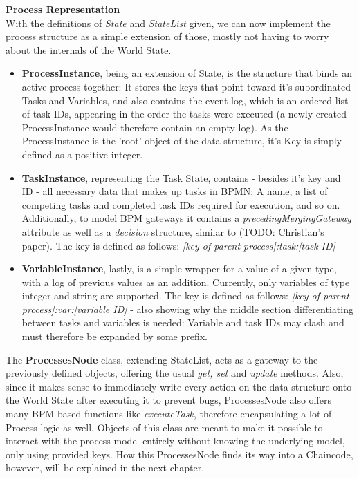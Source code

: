 \textbf{Process Representation} \\[0.2em]
With the definitions of \emph{State} and \emph{StateList} given, we can now implement the process structure as a simple extension of those, mostly not having to worry about the internals of the World State. 
\begin{itemize}
    \item \textbf{ProcessInstance}, being an extension of State, is the structure that binds an active process together: It stores the keys that point toward it's subordinated Tasks and Variables, and also contains the event log, which is an ordered list of task IDs, appearing in the order the tasks were executed (a newly created ProcessInstance would therefore contain an empty log). As the ProcessInstance is the 'root' object of the data structure, it's Key is simply defined as a positive integer.
    \item \textbf{TaskInstance}, representing the Task State, contains - besides it's key and ID - all necessary data that makes up tasks in BPMN: A name, a list of competing tasks and completed task IDs required for execution, and so on. Additionally, to model BPM gateways it contains a \emph{precedingMergingGateway} attribute as well as a \emph{decision} structure, similar to (TODO: Christian's paper). The key is defined as follows: \emph{[key of parent process]:task:[task ID]}
    \item \textbf{VariableInstance}, lastly, is a simple wrapper for a value of a given type, with a log of previous values as an addition. Currently, only variables of type integer and string are supported. The key is defined as follows: \emph{[key of parent process]:var:[variable ID]} - also showing why the middle section differentiating between tasks and variables is needed: Variable and task IDs may clash and must therefore be expanded by some prefix.
\end{itemize}
The \textbf{ProcessesNode} class, extending StateList, acts as a gateway to the previously defined objects, offering the usual \emph{get, set} and \emph{update} methods. Also, since it makes sense to immediately write every action on the data structure onto the World State after executing it to prevent bugs, ProcessesNode also offers many BPM-based functions like \emph{executeTask}, therefore encapsulating a lot of Process logic as well. Objects of this class are meant to make it possible to interact with the process model entirely without knowing the underlying model, only using provided keys. \newline
How this ProcessesNode finds its way into a Chaincode, however, will be explained in the next chapter.

